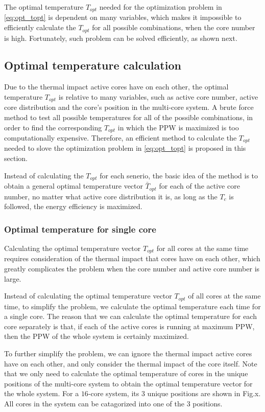 The optimal temperature $T_{opt}$ needed for the optimization problem in \eqref{eq:opt_topt} is dependent on many variables, which makes it impossible to efficiently calculate the $T_{opt}$ for all possible combinations, when the core number is high. Fortunately, such problem can be solved efficiently, as shown next.

\subsection{Optimal temperature calculation}
Due to the thermal impact active cores have on each other, the optimal temperature $T_{opt}$ is relative to many variables, such as active core number, active core distribution and the core's position in the multi-core system. A brute force method to test all possible temperatures for all of the possible combinations, in order to find the corresponding $T_{opt}$ in which the PPW is maximized is too computationally expensive. Therefore, an efficient method to calculate the $T_{opt}$ needed to slove the optimization problem in \eqref{eq:opt_topt} is proposed in this section.

Instead of calculating the $T_{opt}$ for each senerio, the basic idea of the method is to obtain a general optimal temperature vector $\bar{T}_{opt}$ for each of the active core number, no matter what active core distribution it is, as long as the $T_{c}$ is followed, the energy efficiency is maximized.

\subsubsection{Optimal temperature for single core}
Calculating the optimal temperature vector $T_{opt}$ for all cores at the same time requires consideration of the thermal impact that cores have on each other, which greatly complicates the problem when the core number and active core number is large. 

Instead of calculating the optimal temperature vector $T_{opt}$ of all cores at the same time, to simplify the problem, we calculate the optimal temperature each time for a single core.
The reason that we can calculate the optimal temperature for each core separately is that, if each of the active cores is running at maximum PPW, then the PPW of the whole system is certainly maximized.

To further simplify the problem, we can ignore the thermal impact active cores have on each other, and only consider the thermal impact of the core itself. Note that we only need to calculate the optimal temperature of cores in the unique positions of the multi-core system to obtain the optimal temperature vector for the whole system. For a $16$-core system, its $3$ unique positions are shown in Fig.x. All cores in the system can be catagorized into one of the $3$ positions.


